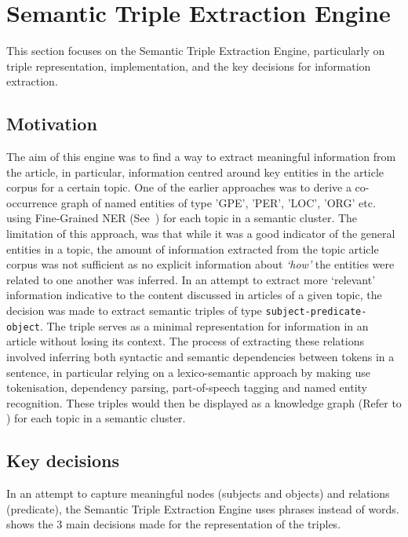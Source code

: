 \chapter{Semantic Triple Extraction Engine}  \label{ch:5:triple}

\vspace{-2ex}
This section focuses on the Semantic Triple Extraction Engine, particularly on triple representation, implementation, and the key decisions for information extraction.

\section{Motivation}
The aim of this engine was to find a way to extract meaningful information from the article, in particular, information centred around key entities in the article corpus for a certain topic. One of the earlier approaches was to derive a co-occurrence graph of named entities of type 'GPE', 'PER', 'LOC', 'ORG' etc. using Fine-Grained NER (See~) for each topic in a semantic cluster. The limitation of this approach, was that while it was a good indicator of the general entities in a topic, the amount of information extracted from the topic article corpus was not sufficient as no explicit information about \textit{`how'} the entities were related to one another was inferred. In an attempt to extract more `relevant' information indicative to the content discussed in articles of a given topic, the decision was made to extract semantic triples of type \texttt{subject-predicate-object}. The triple serves as a minimal representation for information in an article without losing its context. The process of extracting these relations involved inferring both syntactic and semantic dependencies  between tokens in a sentence, in particular relying on a lexico-semantic approach by making use tokenisation, dependency parsing, part-of-speech tagging and named entity recognition. These triples would then be displayed as a knowledge graph (Refer to ) for each topic in a semantic cluster.

\section{Key decisions} \label{key_decisions_rel}

In an attempt to capture meaningful nodes (subjects and objects) and relations (predicate), the Semantic Triple Extraction Engine uses phrases instead of words.  shows the 3 main decisions made for the representation of the triples. 

